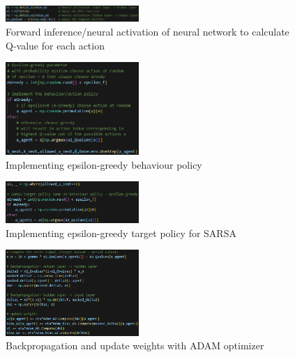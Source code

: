 \documentclass[conference]{IEEEtran}
\begin{document}
\newpage
\appendix

\begin{figure}[htbp]
\centerline{\includegraphics[width=0.45\textwidth]{images/forward_inference.png}}
\caption{Forward inference/neural activation of neural network to calculate Q-value for each action}
\label{fig:forward_inference}
\end{figure}

\begin{figure}[htbp]
\centerline{\includegraphics[width=0.45\textwidth]{images/behaviour_policy.png}}
\caption{Implementing epsilon-greedy behaviour policy}
\label{fig:behaviour_policy}
\end{figure}

\begin{figure}[htbp]
\centerline{\includegraphics[width=0.45\textwidth]{images/target_policy_sarsa.png}}
\caption{Implementing epsilon-greedy target policy for SARSA}
\label{fig:target_policy_sarsa}
\end{figure}

\begin{figure}[htbp]
\centerline{\includegraphics[width=0.45\textwidth]{images/backpropagation.png}}
\caption{Backpropagation and update weights with ADAM optimizer}
\label{fig:backpropagation}
\end{figure}
\end{document}
